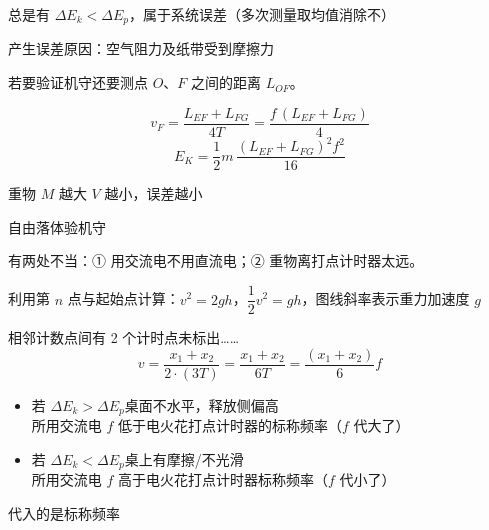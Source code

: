 总是有 $\Delta E_k<\Delta E_p$，属于系统误差（多次测量取均值消除不）

产生误差原因：空气阻力及纸带受到摩擦力


若要验证机守还要测点 $O$、$F$ 之间的距离 $L_{OF}$。

\[ v_F=\frac{L_{EF}+L_{FG}}{4T}=\frac{f\,(L_{EF}+L_{FG})}{4} \]
\[ E_K=\frac12 m\,\frac{(L_{EF}+L_{FG})^2f^2}{16} \]


重物 $M$ 越大 $V$ 越小，误差越小 %

自由落体验机守


有两处不当：① 用交流电不用直流电；② 重物离打点计时器太远。

利用第 $n$ 点与起始点计算：$v^2=2gh$，$\dfrac12v^2=gh$，图线斜率表示重力加速度 $g$

相邻计数点间有 2 个计时点未标出\ldots\ldots
\[ v=\frac{x_1+x_2}{2\cdot(3T)}=\frac{x_1+x_2}{6T}=\frac{(x_1+x_2)}{6}f \]

\begin{itemize}
\item 若 $\Delta E_k>\Delta E_p$\quad 桌面不水平，释放侧偏高 \\
所用交流电 $f$ 低于电火花打点计时器的标称频率（$f$ 代大了） %
\item 若 $\Delta E_k<\Delta E_p$\quad 桌上有摩擦/不光滑 \\
所用交流电 $f$ 高于电火花打点计时器标称频率（$f$ 代小了）
\end{itemize}

代入的是标称频率

